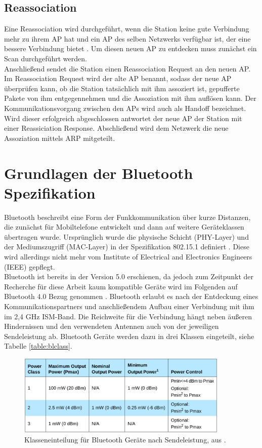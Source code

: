 \subsection{Reassociation}
Eine Reassociation wird durchgeführt, wenn die Station keine gute Verbindung mehr zu ihrem AP hat und ein AP des selben Netzwerks verfügbar ist, der eine bessere Verbindung bietet \cite{ieee2012reassociate}.
Um diesen neuen AP zu entdecken muss zunächst ein Scan durchgeführt werden. \\
Anschließend sendet die Station einen Reassociation Request an den neuen AP. 
Im Reassociation Request wird der alte AP benannt, sodass der neue AP überprüfen kann, ob die Station tatsächlich mit ihm assoziert ist, gepufferte Pakete von ihm entgegennehmen und die Assoziation mit ihm auflösen kann.
Der Kommunikationsvorgang zwischen den APs wird auch als Handoff bezeichnet. 
Wird dieser erfolgreich abgeschlossen antwortet der neue AP der Station mit einer Reassiciation Response.
Abschließend wird dem Netzwerk die neue Assoziation mittels ARP mitgeteilt.


\section{Grundlagen der Bluetooth Spezifikation}
Bluetooth beschreibt eine Form der Funkkommunikation über kurze Distanzen, die zunächst für Mobiltelefone entwickelt und dann auf weitere Geräteklassen übertragen wurde.
Ursprünglich wurde die physische Schicht (PHY-Layer) und der Mediumszugriff (MAC-Layer) in der Spezifikation 802.15.1 definiert \cite{ieee2002blue}. 
Diese wird allerdings nicht mehr vom Institute of Electrical and Electronics Engineers (IEEE) gepflegt. \\
Bluetooth ist bereits in der Version 5.0 erschienen, da jedoch zum Zeitpunkt der Recherche für diese Arbeit kaum kompatible Geräte wird im Folgenden auf Bluetooth 4.0 Bezug genommen \cite{blue2010spec}.
Bluetooth erlaubt es nach der Entdeckung eines Kommunikationspartners und anschließendem Aufbau einer Verbindung mit ihm im 2,4 GHz ISM-Band.
Die Reichweite für die Verbindung hängt neben äußeren Hindernissen und den verwendeten Antennen auch von der jeweiligen Sendeleistung ab.
Bluetooth Geräte werden dazu in drei Klassen eingeteilt, siehe Tabelle \ref{table:blclass}.

\begin{figure}[h]
  \centering
	\includegraphics[width=0.9\textwidth]{images/blueclasses.png}
  \caption{Klasseneinteilung für Bluetooth Geräte nach Sendeleistung, aus \cite{blue2010classes}.}
  \label{fig:blclass}
\end{figure}

